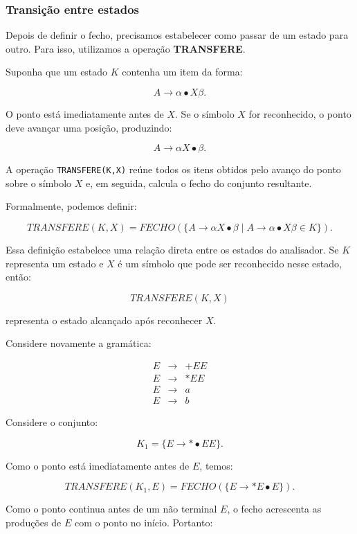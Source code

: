 \documentclass[
  brazilian,
  letterpaper,
]{book}
\theoremstyle{plain}
\theoremstyle{definition}
\theoremstyle{remark}
\begin{document}
\subsubsection{Transição entre
estados}\label{transiuxe7uxe3o-entre-estados}

Depois de definir o fecho, precisamos estabelecer como passar de um
estado para outro. Para isso, utilizamos a operação \textbf{TRANSFERE}.

Suponha que um estado \(K\) contenha um item da forma:

\[
A\rightarrow\alpha\bullet X\beta.
\]

O ponto está imediatamente antes de \(X\). Se o símbolo \(X\) for
reconhecido, o ponto deve avançar uma posição, produzindo:

\[
A\rightarrow\alpha X\bullet\beta.
\]

A operação \texttt{TRANSFERE(K,X)} reúne todos os itens obtidos pelo
avanço do ponto sobre o símbolo \(X\) e, em seguida, calcula o fecho do
conjunto resultante.

Formalmente, podemos definir:

\[
TRANSFERE(K,X)
=
FECHO(\{A\rightarrow\alpha X\bullet\beta
\mid
A\rightarrow\alpha\bullet X\beta\in K\}).
\]

Essa definição estabelece uma relação direta entre os estados do
analisador. Se \(K\) representa um estado e \(X\) é um símbolo que pode
ser reconhecido nesse estado, então:

\[
TRANSFERE(K,X)
\]

representa o estado alcançado após reconhecer \(X\).

Considere novamente a gramática:

\[
\begin{array}{rcl}
E &\rightarrow& +EE\\
E &\rightarrow& *EE\\
E &\rightarrow& a\\
E &\rightarrow& b
\end{array}
\]

Considere o conjunto:

\[
K_1=\{E\rightarrow*\bullet EE\}.
\]

Como o ponto está imediatamente antes de \(E\), temos:

\[
TRANSFERE(K_1,E)
=
FECHO(\{E\rightarrow*E\bullet E\}).
\]

Como o ponto continua antes de um não terminal \(E\), o fecho acrescenta
as produções de \(E\) com o ponto no início. Portanto:
\end{document}
